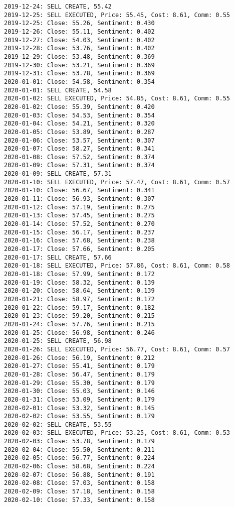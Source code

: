 \documentclass[11pt]{article}
\begin{document}
\begin{Verbatim}[commandchars=\\\{\}]
2019-12-24: SELL CREATE, 55.42
2019-12-25: SELL EXECUTED, Price: 55.45, Cost: 8.61, Comm: 0.55
2019-12-25: Close: 55.26, Sentiment: 0.430
2019-12-26: Close: 55.11, Sentiment: 0.402
2019-12-27: Close: 54.03, Sentiment: 0.402
2019-12-28: Close: 53.76, Sentiment: 0.402
2019-12-29: Close: 53.48, Sentiment: 0.369
2019-12-30: Close: 53.21, Sentiment: 0.369
2019-12-31: Close: 53.78, Sentiment: 0.369
2020-01-01: Close: 54.58, Sentiment: 0.354
2020-01-01: SELL CREATE, 54.58
2020-01-02: SELL EXECUTED, Price: 54.85, Cost: 8.61, Comm: 0.55
2020-01-02: Close: 55.39, Sentiment: 0.420
2020-01-03: Close: 54.53, Sentiment: 0.354
2020-01-04: Close: 54.21, Sentiment: 0.320
2020-01-05: Close: 53.89, Sentiment: 0.287
2020-01-06: Close: 53.57, Sentiment: 0.307
2020-01-07: Close: 58.27, Sentiment: 0.341
2020-01-08: Close: 57.52, Sentiment: 0.374
2020-01-09: Close: 57.31, Sentiment: 0.374
2020-01-09: SELL CREATE, 57.31
2020-01-10: SELL EXECUTED, Price: 57.47, Cost: 8.61, Comm: 0.57
2020-01-10: Close: 56.67, Sentiment: 0.341
2020-01-11: Close: 56.93, Sentiment: 0.307
2020-01-12: Close: 57.19, Sentiment: 0.275
2020-01-13: Close: 57.45, Sentiment: 0.275
2020-01-14: Close: 57.52, Sentiment: 0.270
2020-01-15: Close: 56.17, Sentiment: 0.237
2020-01-16: Close: 57.68, Sentiment: 0.238
2020-01-17: Close: 57.66, Sentiment: 0.205
2020-01-17: SELL CREATE, 57.66
2020-01-18: SELL EXECUTED, Price: 57.86, Cost: 8.61, Comm: 0.58
2020-01-18: Close: 57.99, Sentiment: 0.172
2020-01-19: Close: 58.32, Sentiment: 0.139
2020-01-20: Close: 58.64, Sentiment: 0.139
2020-01-21: Close: 58.97, Sentiment: 0.172
2020-01-22: Close: 59.17, Sentiment: 0.182
2020-01-23: Close: 59.20, Sentiment: 0.215
2020-01-24: Close: 57.76, Sentiment: 0.215
2020-01-25: Close: 56.98, Sentiment: 0.246
2020-01-25: SELL CREATE, 56.98
2020-01-26: SELL EXECUTED, Price: 56.77, Cost: 8.61, Comm: 0.57
2020-01-26: Close: 56.19, Sentiment: 0.212
2020-01-27: Close: 55.41, Sentiment: 0.179
2020-01-28: Close: 56.47, Sentiment: 0.179
2020-01-29: Close: 55.30, Sentiment: 0.179
2020-01-30: Close: 55.03, Sentiment: 0.146
2020-01-31: Close: 53.09, Sentiment: 0.179
2020-02-01: Close: 53.32, Sentiment: 0.145
2020-02-02: Close: 53.55, Sentiment: 0.179
2020-02-02: SELL CREATE, 53.55
2020-02-03: SELL EXECUTED, Price: 53.25, Cost: 8.61, Comm: 0.53
2020-02-03: Close: 53.78, Sentiment: 0.179
2020-02-04: Close: 55.50, Sentiment: 0.211
2020-02-05: Close: 56.77, Sentiment: 0.224
2020-02-06: Close: 58.68, Sentiment: 0.224
2020-02-07: Close: 56.88, Sentiment: 0.191
2020-02-08: Close: 57.03, Sentiment: 0.158
2020-02-09: Close: 57.18, Sentiment: 0.158
2020-02-10: Close: 57.33, Sentiment: 0.158

\end{Verbatim}
\end{document}

